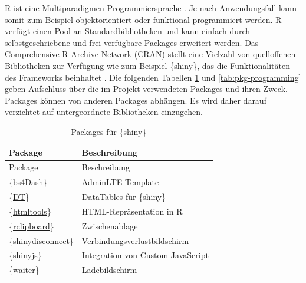 \documentclass[
]{article}
\begin{document}
\href{https://www.r-project.org/}{R} ist eine Multiparadigmen-Programmiersprache \autocite{r-multiparadima}. Je nach Anwendungsfall kann somit zum Beispiel objektorientiert oder funktional programmiert werden. R verfügt einen Pool an Standardbibliotheken und kann einfach durch selbstgeschriebene und frei verfügbare Packages erweitert werden. Das Comprehensive R Archive Network (\href{https://cran.r-project.org/}{CRAN}) stellt eine Vielzahl von quelloffenen Bibliotheken zur Verfügung wie zum Beispiel \{\href{https://shiny.rstudio.com/}{shiny}\}, das die Funktionalitäten des Frameworks beinhaltet \autocite{cran}. Die folgenden Tabellen \ref{tab:pkg-shiny} und \ref{tab:pkg-programming} geben Aufschluss über die im Projekt verwendeten Packages und ihren Zweck. Packages können von anderen Packages abhängen. Es wird daher darauf verzichtet auf untergeordnete Bibliotheken einzugehen.

\begin{longtable}[]{@{}ll@{}}
\caption{\label{tab:pkg-shiny} Packages für \{shiny\}}\tabularnewline
\toprule
Package & Beschreibung \\
\midrule
\endfirsthead
\toprule
Package & Beschreibung \\
\midrule
\endhead
\{\href{https://cran.r-project.org/web/packages/bs4Dash/index.html}{bs4Dash}\} \autocite{R-bs4Dash} & AdminLTE-Template \\
\{\href{https://cran.r-project.org/web/packages/DT/index.html}{DT}\} \autocite{R-DT} & DataTables für \{shiny\} \\
\{\href{https://cran.r-project.org/web/packages/htmltools/index.html}{htmltools}\} \autocite{R-htmltools} & HTML-Repräsentation in R \\
\{\href{https://cran.r-project.org/web/packages/rclipboard/index.html}{rclipboard}\} \autocite{R-rclipboard} & Zwischenablage \\
\{\href{https://cran.r-project.org/web/packages/shinydisconnect/index.html}{shinydisconnect}\} \autocite{R-shinydisconnect} & Verbindungsverlustbildschirm \\
\{\href{https://cran.r-project.org/web/packages/shinyjs/index.html}{shinyjs}\} \autocite{R-shinyjs} & Integration von Custom-JavaScript \\
\{\href{https://cran.r-project.org/web/packages/waiter/index.html}{waiter}\} \autocite{R-waiter} & Ladebildschirm \\
\bottomrule
\end{longtable}
\end{document}
